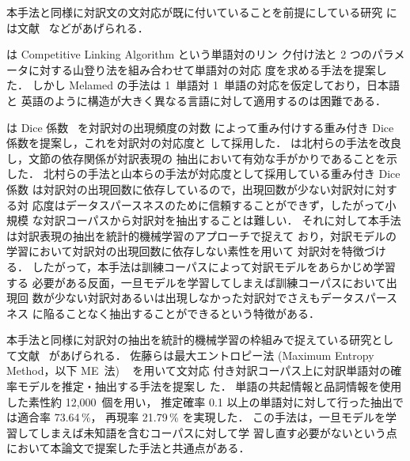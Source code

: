 本手法と同様に対訳文の文対応が既に付いていることを前提にしている研究
には文献~\cite{melamed_97,kitamura_97,yamamoto_01} などがあげられる．

\cite{melamed_97} は Competitive Linking Algorithm という単語対のリン
ク付け法と 2 つのパラメータに対する山登り法を組み合わせて単語対の対応
度を求める手法を提案した．
しかし Melamed の手法は 1~単語対 1~単語の対応を仮定しており，日本語と
英語のように構造が大きく異なる言語に対して適用するのは困難である．

\cite{kitamura_97} は Dice 係数~\cite{kay_93} を対訳対の出現頻度の対数
によって重み付けする重み付き Dice 係数を提案し，これを対訳対の対応度と
して採用した．
\cite{yamamoto_01} は北村らの手法を改良し，文節の依存関係が対訳表現の
抽出において有効な手がかりであることを示した．
北村らの手法と山本らの手法が対応度として採用している重み付き Dice 係数
は対訳対の出現回数に依存しているので，出現回数が少ない対訳対に対する対
応度はデータスパースネスのために信頼することができず，したがって小規模
な対訳コーパスから対訳対を抽出することは難しい．
それに対して本手法は対訳表現の抽出を統計的機械学習のアプローチで捉えて
おり，対訳モデルの学習において対訳対の出現回数に依存しない素性を用いて
対訳対を特徴づける．
したがって，本手法は訓練コーパスによって対訳モデルをあらかじめ学習する
必要がある反面，一旦モデルを学習してしまえば訓練コーパスにおいて出現回
数が少ない対訳対あるいは出現しなかった対訳対でさえもデータスパースネス
に陥ることなく抽出することができるという特徴がある．

本手法と同様に対訳対の抽出を統計的機械学習の枠組みで捉えている研究とし
て文献~\cite{satoken_NLP02} があげられる．
佐藤らは最大エントロピー法
 (Maximum Entropy Method，以下 ME~法) ~\cite{berger_96} を用いて文対応
付き対訳コーパス上に対訳単語対の確率モデルを推定・抽出する手法を提案し
た． 単語の共起情報と品詞情報を使用した素性約 12,000~個を用い，
推定確率 0.1 以上の単語対に対して行った抽出では適合率 73.64\,\%，
再現率 21.79\,\% を実現した．
この手法は，一旦モデルを学習してしまえば未知語を含むコーパスに対して学
習し直す必要がないという点において本論文で提案した手法と共通点がある．

